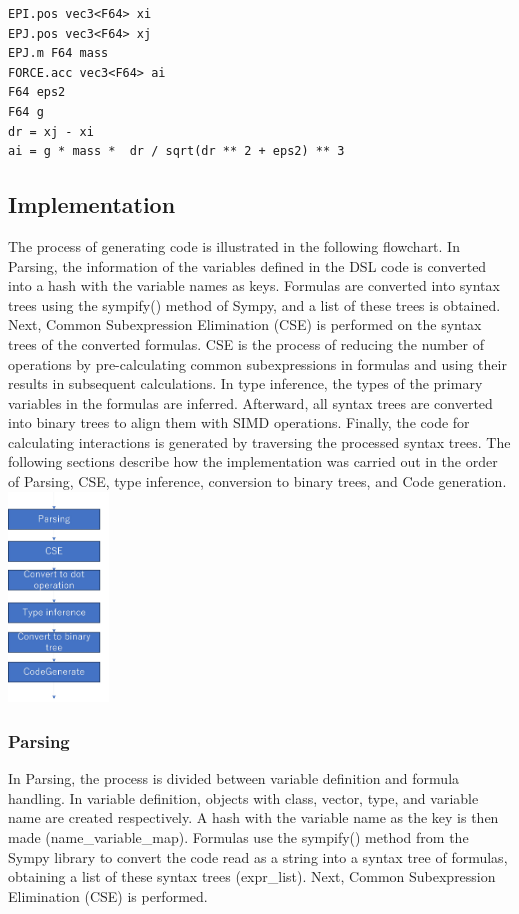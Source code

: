 \documentclass[ams, a4j]{U-AizuGT}
\begin{document}
\begin{lstlisting}[frame=single, caption=hoge, label=fuga]
EPI.pos vec3<F64> xi
EPJ.pos vec3<F64> xj
EPJ.m F64 mass
FORCE.acc vec3<F64> ai
F64 eps2
F64 g
dr = xj - xi
ai = g * mass *  dr / sqrt(dr ** 2 + eps2) ** 3
\end{lstlisting}
\subsection{Implementation}
The process of generating code is illustrated in the following flowchart. In Parsing, the information
of the variables defined in the DSL code is converted into a hash with the variable names as keys. 
Formulas are converted into syntax trees using the sympify() method of Sympy, and a list of these 
trees is obtained. Next, Common Subexpression Elimination (CSE) is performed on the syntax trees of the converted formulas. CSE is the process 
of reducing the number of operations by pre-calculating common subexpressions in formulas and using 
their results in subsequent calculations. In type inference, the types of the primary variables in the 
formulas are inferred. Afterward, all syntax trees are converted into binary trees to align them with 
SIMD operations. Finally, the code for calculating interactions is generated by traversing the processed 
syntax trees. The following sections describe how the implementation was carried out in the order of
Parsing, CSE, type inference, conversion to binary trees, and Code generation.
\includegraphics[width=0.2\textwidth]{flowchartver3.jpg}
\subsubsection{Parsing}
In Parsing, the process is divided between variable definition and formula handling. In variable definition, 
objects with class, vector, type, and variable name are created respectively. A hash with the variable name
as the key is then made (name\_variable\_map). Formulas use the sympify() method from the Sympy library to convert
the code read as a string into a syntax tree of formulas, obtaining a list of these syntax trees (expr\_list). Next, 
Common Subexpression Elimination (CSE) is performed.
\end{document}
